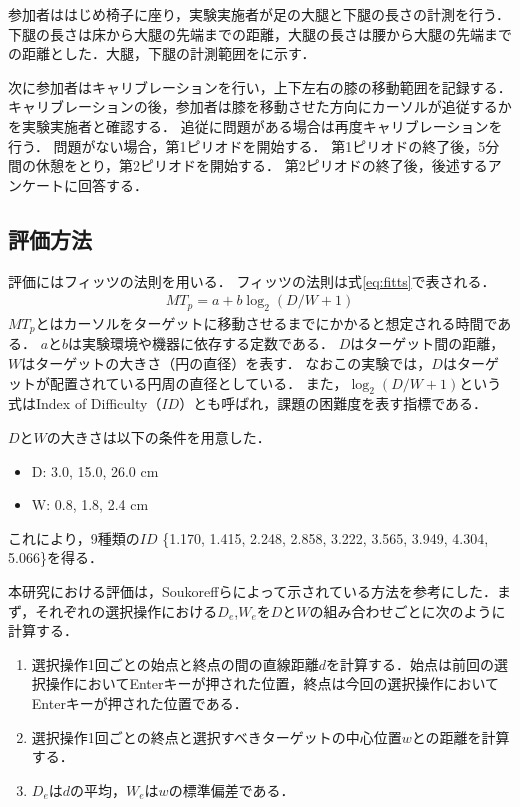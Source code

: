 \documentclass[submit, techrep]{ipsj}
\begin{document}
参加者ははじめ椅子に座り，実験実施者が足の大腿と下腿の長さの計測を行う．下腿の長さは床から大腿の先端までの距離，大腿の長さは腰から大腿の先端までの距離とした．大腿，下腿の計測範囲をに示す．

次に参加者はキャリブレーションを行い，上下左右の膝の移動範囲を記録する．
キャリブレーションの後，参加者は膝を移動させた方向にカーソルが追従するかを実験実施者と確認する．
追従に問題がある場合は再度キャリブレーションを行う．
問題がない場合，第1ピリオドを開始する．
第1ピリオドの終了後，5分間の休憩をとり，第2ピリオドを開始する．
第2ピリオドの終了後，後述するアンケートに回答する．



\subsection{評価方法}
評価にはフィッツの法則\cite{fitts}を用いる．
フィッツの法則は式\ref{eq:fitts}で表される．
\begin{eqnarray}
	MT_p = a + b\log_2{(D/W + 1)}
	\label{eq:fitts}
\end{eqnarray}
$MT_p$とはカーソルをターゲットに移動させるまでにかかると想定される時間である．
$a$と$b$は実験環境や機器に依存する定数である．
$D$はターゲット間の距離，$W$はターゲットの大きさ（円の直径）を表す．
なおこの実験では，$D$はターゲットが配置されている円周の直径としている．
また，$\log_2{(D/W + 1)}$という式はIndex of Difficulty（$ID$）とも呼ばれ，課題の困難度を表す指標である．\par
$D$と$W$の大きさは以下の条件を用意した．
\begin{itemize}
	\item {D: } 3.0, 15.0, 26.0 \si{cm}
	\item {W: } 0.8, 1.8, 2.4 \si{cm}
\end{itemize}
これにより，9種類の$ID$ \{1.170, 1.415, 2.248, 2.858, 3.222, 3.565, 3.949, 4.304, 5.066\}を得る．\par
本研究における評価は，Soukoreffら\cite{Soukoreff:2004:TSP:1056153.1056155}によって示されている方法を参考にした．まず，それぞれの選択操作における$D_e$,$W_e$を$D$と$W$の組み合わせごとに次のように計算する．
\begin{enumerate}
	\item 選択操作1回ごとの始点と終点の間の直線距離$d$を計算する．始点は前回の選択操作においてEnterキーが押された位置，終点は今回の選択操作においてEnterキーが押された位置である．
	\item 選択操作1回ごとの終点と選択すべきターゲットの中心位置$w$との距離を計算する．
	\item $D_e$は$d$の平均，$W_e$は$w$の標準偏差である．
\end{enumerate}
\end{document}
